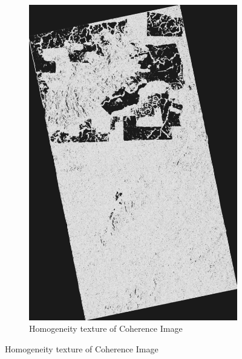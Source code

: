 \begin{figure}[H]
\begin{subfigure}[b]{0.4\linewidth}
    \includegraphics[width=\linewidth]{Chapter4/glcm_textures/homogeneityimage.png}
    \caption{Homogeneity texture of Coherence Image}
  \end{subfigure}
\end{figure}

